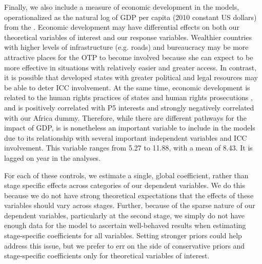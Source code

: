 Finally, we also include a measure of economic development in the models, operationalized as the natural log of GDP per capita (2010 constant US dollars) from the \citet{world2018world}.  Economic development may have differential effects on both our theoretical variables of interest and our response variables. Wealthier countries with higher levels of infrastructure (e.g. roads) and bureaucracy may be more attractive places for the OTP to become involved because she can expect to be more effective in situations with relatively easier and greater access. In contrast, it is possible that developed states with greater political and legal resources may be able to deter ICC involvement. At the same time, economic development is related to the human rights practices of states \citep{hill:jones:2014} and human rights prosecutions \cite{kim2012structural}, and is positively correlated with P5 interests and strongly negatively correlated with our Africa dummy. Therefore, while there are different pathways for the impact of GDP, is is nonetheless an important variable to include in the models due to its relationship with several important independent variables and ICC involvement. This variable ranges from 5.27 to 11.88, with a mean of 8.43. It is lagged on year in the analyses.

For each of these controls, we estimate a single, global coefficient, rather than stage specific effects across categories of our dependent variables. We do this because we do not have strong theoretical expectations that the effects of these variables should vary across stages. Further, because of the sparse nature of our dependent variables, particularly at the second stage, we simply do not have enough data for the model to ascertain well-behaved results when estimating stage-specific coefficients for all variables. Setting stronger priors could help address this issue, but we prefer to err on the side of conservative priors and stage-specific coefficients only for theoretical variables of interest.


